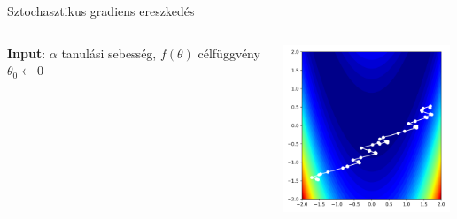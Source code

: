 \documentclass[english, aspectratio=169]{beamer}
\begin{document}
\begin{frame}{Sztochasztikus gradiens ereszkedés}
	\begin{columns}
		\begin{column}{.7\textwidth}
			\begin{algorithm}[H]
				\caption{Sztochasztikus gradiens ereszkedés}
				\SetAlgoLined
				\textbf{Input}: $\alpha$ tanulási sebesség, $f(\theta)$ célfüggvény\\
				$\theta_0 \leftarrow 0$ 
			\end{algorithm}
		\end{column}
		\begin{column}{.3\textwidth}
			\begin{center}
				\includegraphics[height=5cm, width=5cm, keepaspectratio]{images/gd_stochastic.png}
			\end{center}
		\end{column}
	\end{columns}
\end{frame}
\end{document}
